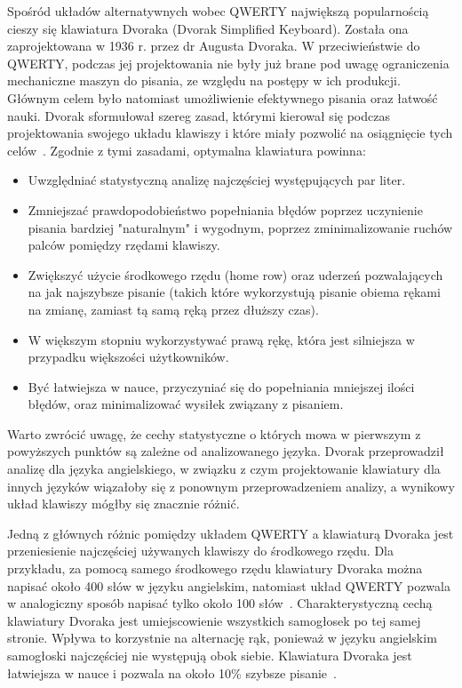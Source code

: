 \documentclass{xmgr}
\begin{document}
Spośród układów alternatywnych wobec QWERTY największą popularnością cieszy się klawiatura Dvoraka (Dvorak Simplified Keyboard). Została ona zaprojektowana w 1936 r. przez dr Augusta Dvoraka. W przeciwieństwie do QWERTY, podczas jej projektowania nie były już brane pod uwagę ograniczenia mechaniczne maszyn do pisania, ze względu na postępy w ich produkcji. Głównym celem było natomiast umożliwienie efektywnego pisania oraz łatwość nauki. Dvorak sformułował szereg zasad, którymi kierował się podczas projektowania swojego układu klawiszy i które miały pozwolić na osiągnięcie tych celów~\cite{cassingham1986dvorak}. Zgodnie z tymi zasadami, optymalna klawiatura powinna:
\begin{itemize}
\item Uwzględniać statystyczną analizę najczęściej występujących par liter.
\item Zmniejszać prawdopodobieństwo popełniania błędów poprzez uczynienie pisania bardziej "naturalnym" i wygodnym, poprzez zminimalizowanie ruchów palców pomiędzy rzędami klawiszy.
\item Zwiększyć użycie środkowego rzędu (home row) oraz uderzeń pozwalających na jak najszybsze pisanie (takich które wykorzystują pisanie obiema rękami na zmianę, zamiast tą samą ręką przez dłuższy czas).
\item W większym stopniu wykorzystywać prawą rękę, która jest silniejsza w przypadku większości użytkowników.
\item Być łatwiejsza w nauce, przyczyniać się do popełniania mniejszej ilości błędów, oraz minimalizować wysiłek związany z pisaniem.
\end{itemize}
Warto zwrócić uwagę, że cechy statystyczne o których mowa w pierwszym z powyższych punktów są zależne od analizowanego języka. Dvorak przeprowadził analizę dla języka angielskiego, w związku z czym projektowanie klawiatury dla innych języków wiązałoby się z ponownym przeprowadzeniem analizy, a wynikowy układ klawiszy mógłby się znacznie różnić.

Jedną z głównych różnic pomiędzy układem QWERTY a klawiaturą Dvoraka jest przeniesienie najczęściej używanych klawiszy do środkowego rzędu. Dla przykładu, za pomocą samego środkowego rzędu klawiatury Dvoraka można napisać około 400 słów w języku angielskim, natomiast układ QWERTY pozwala w analogiczny sposób napisać tylko około 100 słów~\cite{Call:2005:CME}. Charakterystyczną cechą klawiatury Dvoraka jest umiejscowienie wszystkich samogłosek po tej samej stronie. Wpływa to korzystnie na alternację rąk, ponieważ w języku angielskim samogłoski najczęściej nie występują obok siebie. Klawiatura Dvoraka jest łatwiejsza w nauce i pozwala na około 10\% szybsze pisanie~\cite{Norman:1988:DOET}.
\end{document}
